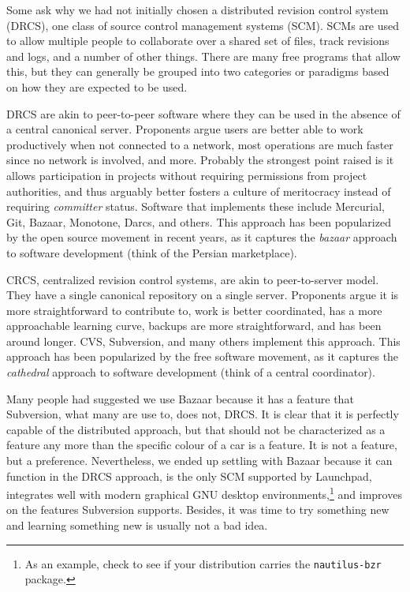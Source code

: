 
Some ask why we had not initially chosen a distributed revision control system (DRCS), one class of source control management systems (SCM). SCMs are used to allow multiple people to collaborate over a shared set of files, track revisions and logs, and a number of other things. There are many free programs that allow this, but they can generally be grouped into two categories or paradigms based on how they are expected to be used.

DRCS are akin to peer-to-peer software where they can be used in the absence of a central canonical server. Proponents argue users are better able to work productively when not connected to a network, most operations are much faster since no network is involved, and more. Probably the strongest point raised is it allows participation in projects without requiring permissions from project authorities, and thus arguably better fosters a culture of meritocracy instead of requiring {\it committer} status. Software that implements these include Mercurial, Git, Bazaar, Monotone, Darcs, and others. This approach has been popularized by the open source movement in recent years, as it captures the {\it bazaar} approach to software development (think of the Persian marketplace).

CRCS, centralized revision control systems, are akin to peer-to-server model. They have a single canonical repository on a single server. Proponents argue it is more straightforward to contribute to, work is better coordinated, has a more approachable learning curve, backups are more straightforward, and has been around longer. CVS, Subversion, and many others implement this approach. This approach has been popularized by the free software movement, as it captures the {\it cathedral} approach to software development (think of a central coordinator).

Many people had suggested we use Bazaar because it has a feature that Subversion, what many are use to, does not, DRCS. It is clear that it is perfectly capable of the distributed approach, but that should not be characterized as a feature any more than the specific colour of a car is a feature. It is not a feature, but a preference. Nevertheless, we ended up settling with Bazaar because it can function in the DRCS approach, is the only SCM supported by Launchpad, integrates well with modern graphical GNU desktop environments,\footnote{As an example, check to see if your distribution carries the {\tt nautilus-bzr} package.} and improves on the features Subversion supports. Besides, it was time to try something new and learning something new is usually not a bad idea.

